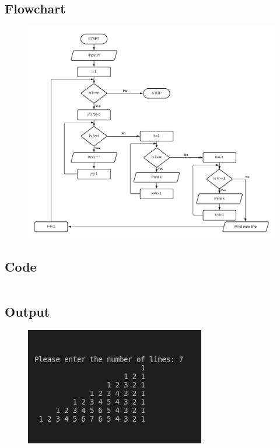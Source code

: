 \documentclass[12pt]{article}
\begin{document}
\section{}
\subsection{Flowchart}
\begin{figure}[h]
    \centering
    \includegraphics[width=1.1\textwidth]{Flowchart11.png}
\end{figure}
\newpage
\subsection{Code}
\inputminted{c}{q11.c}
\subsection{Output}
\begin{figure}[h]
    \centering
    \includegraphics[width=0.7\textwidth]{11.png}
\end{figure}
\end{document}
